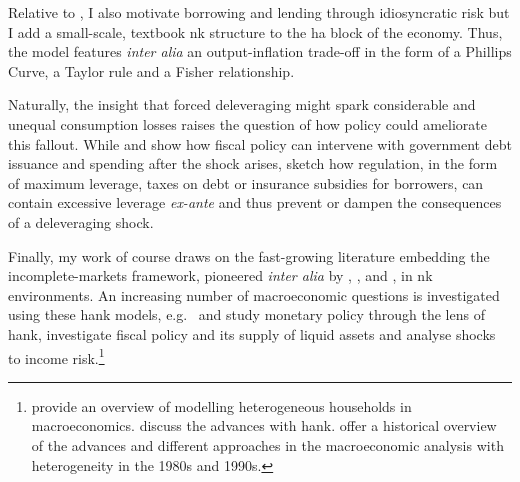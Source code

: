 \documentclass[a4paper,12pt]{article} %
\numberwithin{equation}{section} %
\numberwithin{figure}{section}
\numberwithin{table}{section}
\begin{document}
Relative to \textcite{gl2017}, I also motivate borrowing and lending through idiosyncratic risk but I add a small-scale, textbook \Gls{nk} structure to the \Gls{ha} block of the economy. Thus, the model features \textit{inter alia} an output-inflation trade-off in the form of a Phillips Curve, a Taylor rule and a Fisher relationship.

Naturally, the insight that forced deleveraging might spark considerable and unequal consumption losses raises the question of how policy could ameliorate this fallout. While \textcite{egg2012} and \textcite{gl2017} show how fiscal policy can intervene with government debt issuance and spending after the shock arises, \textcite{korinek2016} sketch how regulation, in the form of maximum leverage, taxes on debt or insurance subsidies for borrowers, can contain excessive leverage \textit{ex-ante} and thus prevent or dampen the consequences of a deleveraging shock.

Finally, my work of course draws on the fast-growing literature embedding the incomplete-markets framework, pioneered \textit{inter alia} by \textcite{bewley1986}, \textcite{im1989}, \textcite{huggett1993} and \textcite{aiyagari1994}, in \Gls{nk} environments. An increasing number of macroeconomic questions is investigated using these \Gls{hank} models, e.g.~\textcite{mckay2016} and \textcite{kaplan2018} study monetary policy through the lens of \Gls{hank}, \textcite{bayer2023} investigate fiscal policy and its supply of liquid assets and \textcite{bayer2019} analyse shocks to income risk.\footnote{\textcite{heath2009} provide an overview of modelling heterogeneous households in macroeconomics. \textcite{kv2018} discuss the advances with \Gls{hank}. \textcite{cherrier2023} offer a historical overview of the advances and different approaches in the macroeconomic analysis with heterogeneity in the 1980s and 1990s.}

\end{document}
